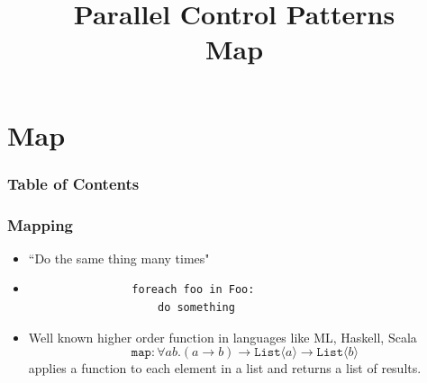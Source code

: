 \documentclass[xcolor=dvipsnames]{beamer}
\begin{document}
	\title[Map Pattern]{Parallel Control Patterns\\Map}
	\author[]{\className}
	\institute[\className]{\departmentName}
	\date{} 


	\begin{frame}
		\maketitle
	\end{frame}


\section{Map} 

	\begin{frame} \frametitle{Table of Contents}
		\tableofcontents[currentsection]
	\end{frame} 
	
	
	\begin{frame}[fragile] \frametitle{Mapping}
		\begin{itemize}
				\item ``Do the same thing many times"
				\item \begin{verbatim}
				foreach foo in Foo:
				    do something
				\end{verbatim}
				\item Well known higher order function in languages like ML, 
				Haskell, Scala
				\[ \texttt{map} : \forall a b. (a \to b) \to \texttt{List}\langle 
				a\rangle \to \texttt{List}\langle b\rangle \]
				applies a function to each element in a list and returns a list 
                of results.\\
		\end{itemize}
	\end{frame}
		
\end{document}
